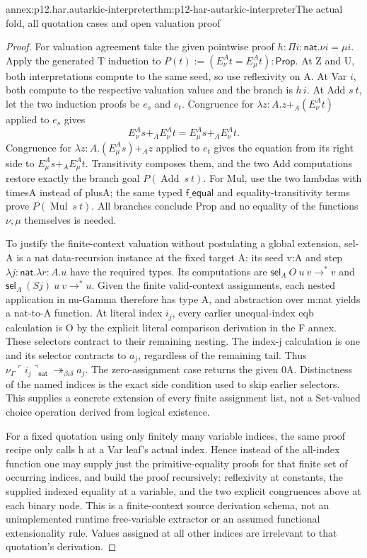 \begin{annexitem}{annex:p12.har.autarkic-interpreter}{thm:p12-har-autarkic-interpreter}{The actual fold, all quotation cases and open valuation proof}
\begin{proof}
For valuation agreement take the given pointwise proof
\(h:\Pi i:\mathsf{nat}.\nu i=\mu i\).
Apply the generated T induction to
\(P(t):=(E_\nu^A t=E_\mu^A t):\mathsf{Prop}\).
At Z and U, both interpretations compute to the same seed, so use
reflexivity on A. At Var \(i\), both compute to the respective valuation
values and the branch is \(h\,i\). At Add \(s\ t\), let the two induction
proofs be \(e_s\) and \(e_t\). Congruence for
\(\lambda z:A.z+_A(E_\nu^A t)\) applied to \(e_s\) gives
\[
 E_\nu^A s+_A E_\nu^A t=E_\mu^A s+_A E_\nu^A t.
\]
Congruence for \(\lambda z:A.(E_\mu^A s)+_A z\) applied to \(e_t\)
gives the equation from its right side to
\(E_\mu^A s+_A E_\mu^A t\). Transitivity composes them, and
the two Add computations restore exactly the branch goal \(P(\operatorname{Add}\ s\ t)\).
For Mul, use the two lambdas with timesA instead of plusA; the same
typed \(\mathsf{f\_equal}\) and equality-transitivity terms prove \(P(\operatorname{Mul}\ s\ t)\).
All branches conclude Prop and no equality of the functions \(\nu,\mu\)
themselves is needed.

To justify the finite-context valuation without postulating a global
extension, sel-A is a nat data-recursion instance at the fixed target A:
its seed v:A and step \(\lambda j:\mathsf{nat}.\lambda r:A.u\)
have the required types. Its computations are
\(\mathsf{sel}_A\ O\ u\ v\longrightarrow^*v\) and
\(\mathsf{sel}_A\ (S j)\ u\ v\longrightarrow^*u\).
Given the finite valid-context assignments, each nested application in
nu-Gamma therefore has type A, and abstraction over m:nat yields a
nat-to-A function. At literal index \(i_j\), every earlier unequal-index
eqb calculation is O by the explicit literal comparison derivation in
the F annex. These selectors contract to their remaining nesting.
The index-j calculation is one and its selector contracts to \(a_j\),
regardless of the remaining tail. Thus
\(\nu_\Gamma\ulcorner i_j\urcorner_{\mathsf{nat}}
\twoheadrightarrow_{\beta\iota\delta}a_j\).
The zero-assignment case returns the given 0A. Distinctness of the named
indices is the exact side condition used to skip earlier selectors.
This supplies a concrete extension of every finite assignment list,
not a Set-valued choice operation derived from logical existence.

For a fixed quotation using only finitely many variable indices,
the same proof recipe only calls h at a Var leaf's actual index.
Hence instead of the all-index function one may supply just the
primitive-equality proofs for that finite set of occurring indices,
and build the proof recursively: reflexivity at constants, the supplied
indexed equality at a variable, and the two explicit congruences above
at each binary node. This is a finite-context source derivation schema,
not an unimplemented runtime free-variable extractor or an assumed
functional extensionality rule. Values assigned at all other indices
are irrelevant to that quotation's derivation.


\end{proof}
\end{annexitem}
